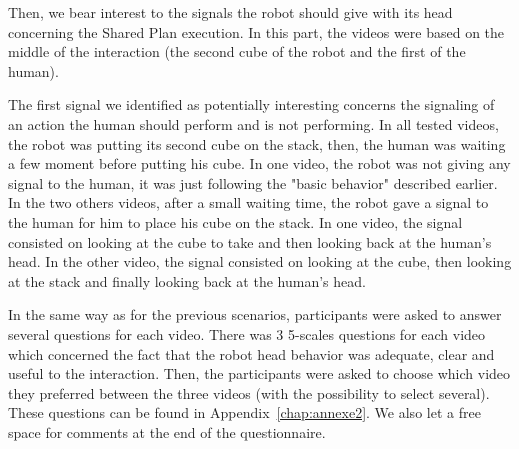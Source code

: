 \documentclass[english,a4paper,11pt,twoside]{StyleThese}
\begin{document}
Then, we bear interest to the signals the robot should give with its head concerning the Shared Plan execution. In this part, the videos were based on the middle of the interaction (the second cube of the robot and the first of the human).

The first signal we identified as potentially interesting concerns the signaling of an action the human should perform and is not performing. In all tested videos, the robot was putting its second cube on the stack, then, the human was waiting a few moment before putting his cube. In one video, the robot was not giving any signal to the human, it was just following the "basic behavior" described earlier. In the two others videos, after a small waiting time, the robot gave a signal to the human for him to place his cube on the stack. In one video, the signal consisted on looking at the cube to take and then looking back at the human's head. In the other video, the signal consisted on looking at the cube, then looking at the stack and finally looking back at the human's head.

In the same way as for the previous scenarios, participants were asked to answer several questions for each video. There was 3 5-scales questions for each video which concerned the fact that the robot head behavior was adequate, clear and useful to the interaction. Then, the participants were asked to choose which video they preferred between the three videos (with the possibility to select several). These questions can be found in Appendix~\ref{chap:annexe2}. We also let a free space for comments at the end of the questionnaire.
\end{document}
